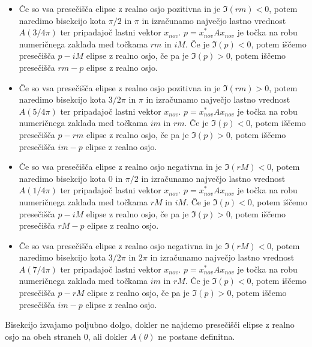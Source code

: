 \documentclass[12pt,a4paper]{amsart}
\theoremstyle{definition}
\theoremstyle{plain}
\begin{document}
\begin{itemize}
\item Če so vsa presečišča elipse z realno osjo pozitivna in je $\Im (rm) <0$, potem naredimo bisekcijo kota $\pi /2$ in $\pi$ in izračunamo največjo lastno vrednost $A(3/4 \pi)$ ter pripadajoč lastni vektor $x_{nov}$. 
$p = x_{nov}^\ast A x_{nov}$ je točka na robu numeričnega zaklada med točkama $rm$ in $iM$. 
Če je $\Im (p) <0$, potem iščemo presečišča $p-iM$ elipse z realno osjo, če pa je $\Im (p) >0$, potem iščemo presečišča $rm-p$ elipse z realno osjo.

\item Če so vsa presečišča elipse z realno osjo pozitivna in je $\Im (rm) >0$, potem naredimo bisekcijo kota $3/2 \pi$ in $\pi$ in izračunamo največjo lastno vrednost $A(5/4 \pi)$ ter pripadajoč lastni vektor $x_{nov}$. 
$p = x_{nov}^\ast A x_{nov}$ je točka na robu numeričnega zaklada med točkama $im$ in $rm$. 
Če je $\Im (p) <0$, potem iščemo presečišča $p-rm$ elipse z realno osjo, če pa je $\Im (p) >0$, potem iščemo presečišča $im-p$ elipse z realno osjo.

\item Če so vsa presečišča elipse z realno osjo negativna in je $\Im (rM) <0$, potem naredimo bisekcijo kota $0$ in $\pi /2$ in izračunamo največjo lastno vrednost $A(1/4 \pi)$ ter pripadajoč lastni vektor $x_{nov}$. 
$p = x_{nov}^\ast A x_{nov}$ je točka na robu numeričnega zaklada med točkama $rM$ in $iM$. 
Če je $\Im (p) <0$, potem iščemo presečišča $p-iM$ elipse z realno osjo, če pa je $\Im (p) >0$, potem iščemo presečišča $rM-p$ elipse z realno osjo.

\item Če so vsa presečišča elipse z realno osjo negativna in je $\Im (rM) <0$, potem naredimo bisekcijo kota $3/2 \pi$ in $2\pi$ in izračunamo največjo lastno vrednost $A(7/4 \pi)$ ter pripadajoč lastni vektor $x_{nov}$. 
$p = x_{nov}^\ast A x_{nov}$ je točka na robu numeričnega zaklada med točkama $im$ in $rM$. 
Če je $\Im (p) <0$, potem iščemo presečišča $p-rM$ elipse z realno osjo, če pa je $\Im (p) >0$, potem iščemo presečišča $im-p$ elipse z realno osjo.

\end{itemize}

Bisekcijo izvajamo poljubno dolgo, dokler ne najdemo presečišči elipse z realno osjo na obeh straneh 0, ali dokler $A(\theta)$ ne postane definitna.

\end{document}
